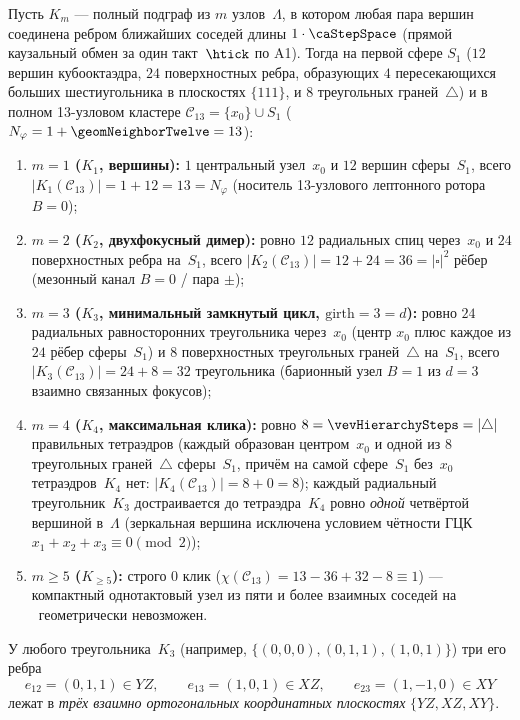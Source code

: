 \begin{theorem}
\label{thm:floor2-fcc-cliques}
Пусть $K_m$ --- полный подграф из $m$ узлов~$\Lambda$, в котором любая пара вершин
соединена ребром ближайших соседей длины $1\cdot\caStepSpace$ (прямой каузальный обмен за один такт~$\htick$ по A1).
Тогда на первой сфере $S_1$ ($12$ вершин кубооктаэдра, $24$ поверхностных ребра, образующих $4$ пересекающихся больших шестиугольника в плоскостях $\{111\}$, и $8$ треугольных граней~$\triangle$) и в полном 13-узловом кластере $\mathcal{C}_{13} = \{x_0\}\cup S_1$ ($N_\varphi = 1 + \geomNeighborTwelve = 13$):
\begin{enumerate}[noitemsep]
\item \textbf{$m=1$ ($K_1$, вершины):} $1$ центральный узел~$x_0$ и $12$ вершин сферы~$S_1$, всего $|K_1(\mathcal{C}_{13})| = 1 + 12 = 13 = N_\varphi$ (носитель 13-узлового лептонного ротора $B=0$);
\item \textbf{$m=2$ ($K_2$, двухфокусный димер):} ровно $12$ радиальных спиц через~$x_0$ и $24$ поверхностных ребра на~$S_1$, всего $|K_2(\mathcal{C}_{13})| = 12 + 24 = 36 = |\square|^2$ рёбер (мезонный канал $B=0$ / пара $\pm$);
\item \textbf{$m=3$ ($K_3$, минимальный замкнутый цикл, $\mathrm{girth}=3=d$):} ровно $24$ радиальных равносторонних треугольника через~$x_0$ (центр $x_0$ плюс каждое из $24$ рёбер сферы~$S_1$) и $8$ поверхностных треугольных граней~$\triangle$ на~$S_1$, всего $|K_3(\mathcal{C}_{13})| = 24 + 8 = 32$ треугольника (барионный узел $B=1$ из $d=3$ взаимно связанных фокусов);
\item \textbf{$m=4$ ($K_4$, максимальная клика):} ровно $8 = \vevHierarchySteps = |\triangle|$ правильных тетраэдров (каждый образован центром~$x_0$ и одной из $8$ треугольных граней~$\triangle$ сферы~$S_1$, причём на самой сфере~$S_1$ без~$x_0$ тетраэдров~$K_4$ нет: $|K_4(\mathcal{C}_{13})| = 8 + 0 = 8$);
  каждый радиальный треугольник~$K_3$ достраивается до тетраэдра~$K_4$ ровно \emph{одной} четвёртой вершиной в~$\Lambda$
  (зеркальная вершина исключена условием чётности ГЦК $x_1+x_2+x_3\equiv 0\pmod 2$);
\item \textbf{$m\ge 5$ ($K_{\ge 5}$):} строго $0$ клик ($\chi(\mathcal{C}_{13}) = 13 - 36 + 32 - 8 \equiv 1$) --- компактный однотактовый узел из пяти и более взаимных соседей
  на \latGCKshort\ геометрически невозможен.
\end{enumerate}
У любого треугольника~$K_3$ (например, $\{(0,0,0),(0,1,1),(1,0,1)\}$) три его ребра
\[
  e_{12}=(0,1,1)\in YZ,\qquad
  e_{13}=(1,0,1)\in XZ,\qquad
  e_{23}=(1,-1,0)\in XY
\]
лежат в \emph{трёх взаимно ортогональных координатных плоскостях} $\{YZ,XZ,XY\}$.
\end{theorem}

